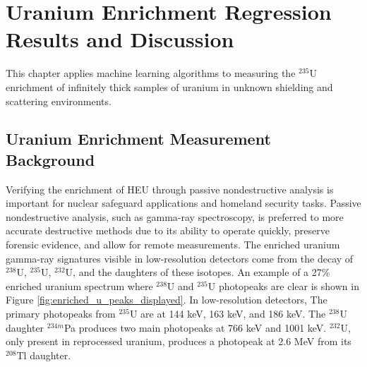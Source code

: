 \chapter{Uranium Enrichment Regression Results and Discussion}





This chapter applies machine learning algorithms to measuring the $^{235}$U enrichment of infinitely thick samples of uranium in unknown shielding and scattering environments.

\section{Uranium Enrichment Measurement Background}

Verifying the enrichment of HEU through passive nondestructive analysis is important for nuclear safeguard applications and homeland security tasks. Passive nondestructive analysis, such as gamma-ray spectroscopy, is preferred to more accurate destructive methods due to its ability to operate quickly, preserve forensic evidence, and allow for remote measurements. The enriched uranium gamma-ray signatures visible in low-resolution detectors come from the decay of $^{238}$U, $^{235}$U, $^{232}$U, and the daughters of these isotopes. An example of a 27\% enriched uranium spectrum where $^{238}$U and $^{235}$U photopeaks are clear is shown in Figure \ref{fig:enriched_u_peaks_displayed}. In low-resolution detectors, The primary photopeaks from $^{235}$U are at 144 keV, 163 keV, and 186 keV. The $^{238}$U daughter $^{234m}$Pa produces two main photopeaks at 766 keV and 1001 keV. $^{232}$U, only present in reprocessed uranium, produces a photopeak at 2.6 MeV from its $^{208}$Tl daughter.

